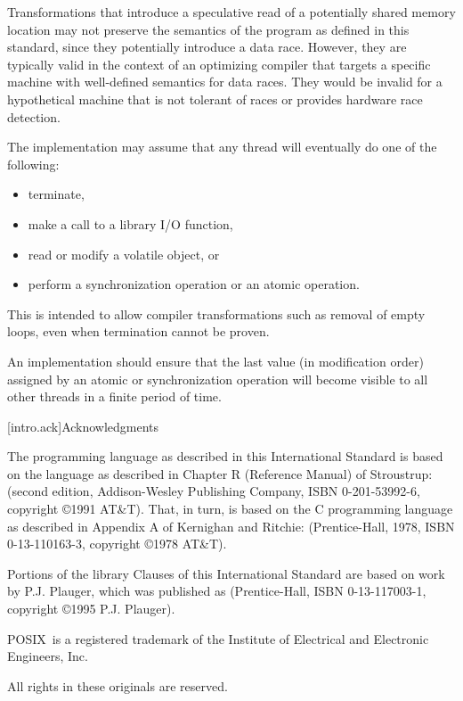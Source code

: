 \pnum
\enternote Transformations that introduce a speculative read of a potentially
shared memory location may not preserve the semantics of the \Cpp program as
defined in this standard, since they potentially introduce a data race. However,
they are typically valid in the context of an optimizing compiler that targets a
specific machine with well-defined semantics for data races. They would be
invalid for a hypothetical machine that is not tolerant of races or provides
hardware race detection. \exitnote

\pnum
The implementation may assume that any thread will eventually do one of the 
following:

\begin{itemize}
\item 
terminate,

\item
make a call to a library I/O function,

\item
read or modify a volatile object, or

\item
perform a synchronization operation or an atomic operation.
\end{itemize}

\enternote This is intended to allow compiler transformations such as removal of
empty loops, even when termination cannot be proven. \exitnote

\pnum
An implementation should ensure that the last value (in modification order)
assigned by an atomic or synchronization operation will become visible to all
other threads in a finite period of time.%
%

[intro.ack]{Acknowledgments}

\pnum
The \Cpp  programming language as described in this International
Standard is based on the language as described in Chapter R (Reference
Manual) of Stroustrup:  (second
edition, Addison-Wesley Publishing Company, ISBN 0-201-53992-6,
copyright \copyright 1991 AT\&T). That, in turn, is based on the C
programming language as described in Appendix A of Kernighan and
Ritchie:  (Prentice-Hall, 1978, ISBN
0-13-110163-3, copyright \copyright 1978 AT\&T).

\pnum
Portions of the library Clauses of this International Standard are based
on work by P.J. Plauger, which was published as  (Prentice-Hall, ISBN 0-13-117003-1, copyright
\copyright 1995 P.J. Plauger).

\pnum
POSIX\textregistered\ is a registered trademark of the Institute of Electrical and
Electronic Engineers, Inc.

\pnum
All rights in these originals are reserved.
